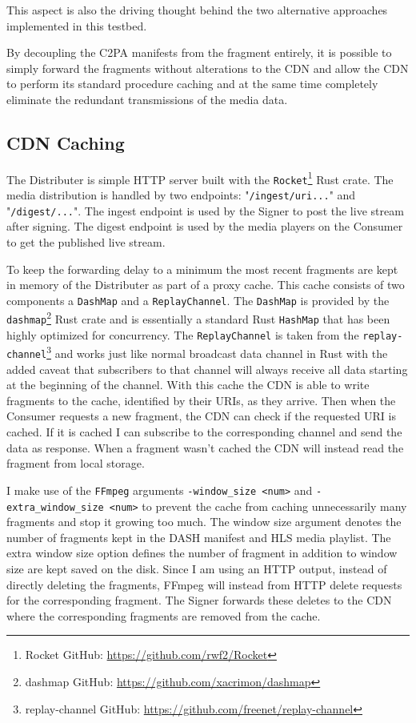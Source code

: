 This aspect is also the driving thought behind the two alternative approaches implemented in this testbed.

By decoupling the C2PA manifests from the fragment entirely, it is possible to simply forward the fragments without alterations to the CDN and allow the CDN to perform its standard procedure caching and at the same time completely eliminate the redundant transmissions of the media data.

\subsection{CDN Caching\label{sec:caching}}

The Distributer is simple HTTP server built with the \texttt{Rocket}\footnote{Rocket GitHub: \url{https://github.com/rwf2/Rocket}} Rust crate. The media distribution is handled by two endpoints: "\texttt{/ingest/uri...}" and "\texttt{/digest/...}". The ingest endpoint is used by the Signer to post the live stream after signing. The digest endpoint is used by the media players on the Consumer to get the published live stream.

To keep the forwarding delay to a minimum the most recent fragments are kept in memory of the Distributer as part of a proxy cache. This cache consists of two components a \texttt{DashMap} and a \texttt{ReplayChannel}. The \texttt{DashMap} is provided by the \texttt{dashmap}\footnote{dashmap GitHub: \url{https://github.com/xacrimon/dashmap}} Rust crate and is essentially a standard Rust \texttt{HashMap} that has been highly optimized for concurrency. The \texttt{ReplayChannel} is taken from the \texttt{replay-channel}\footnote{replay-channel GitHub: \url{https://github.com/freenet/replay-channel}} and works just like normal broadcast data channel in Rust with the added caveat that subscribers to that channel will always receive all data starting at the beginning of the channel. With this cache the CDN is able to write fragments to the cache, identified by their URIs, as they arrive. Then when the Consumer requests a new fragment, the CDN can check if the requested URI is cached. If it is cached I can subscribe to the corresponding channel and send the data as response. When a fragment wasn't cached the CDN will instead read the fragment from local storage.

I make use of the \texttt{FFmpeg} arguments \texttt{-window\_size <num>} and \texttt{-extra\_window\_size <num>} to prevent the cache from caching unnecessarily many fragments and stop it growing too much. The window size argument denotes the number of fragments kept in the DASH manifest and HLS media playlist. The extra window size option defines the number of fragment in addition to window size are kept saved on the disk. Since I am using an HTTP output, instead of directly deleting the fragments, FFmpeg will instead from HTTP delete requests for the corresponding fragment. The Signer forwards these deletes to the CDN where the corresponding fragments are removed from the cache.

